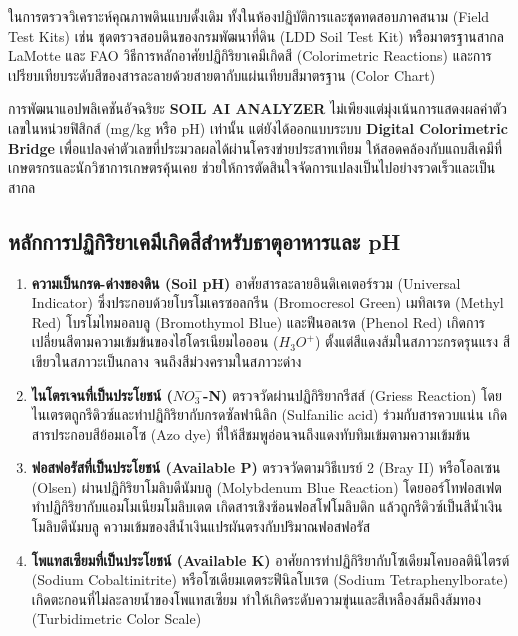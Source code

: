 ในการตรวจวิเคราะห์คุณภาพดินแบบดั้งเดิม ทั้งในห้องปฏิบัติการและชุดทดสอบภาคสนาม (Field Test Kits) เช่น ชุดตรวจสอบดินของกรมพัฒนาที่ดิน (LDD Soil Test Kit) หรือมาตรฐานสากล LaMotte และ FAO วิธีการหลักอาศัยปฏิกิริยาเคมีเกิดสี (Colorimetric Reactions) และการเปรียบเทียบระดับสีของสารละลายด้วยสายตากับแผ่นเทียบสีมาตรฐาน (Color Chart)

การพัฒนาแอปพลิเคชันอัจฉริยะ \textbf{SOIL AI ANALYZER} ไม่เพียงแต่มุ่งเน้นการแสดงผลค่าตัวเลขในหน่วยฟิสิกส์ ($\text{mg/kg}$ หรือ $\text{pH}$) เท่านั้น แต่ยังได้ออกแบบระบบ \textbf{Digital Colorimetric Bridge} เพื่อแปลงค่าตัวเลขที่ประมวลผลได้ผ่านโครงข่ายประสาทเทียม ให้สอดคล้องกับแถบสีเคมีที่เกษตรกรและนักวิชาการเกษตรคุ้นเคย ช่วยให้การตัดสินใจจัดการแปลงเป็นไปอย่างรวดเร็วและเป็นสากล

\subsection{หลักการปฏิกิริยาเคมีเกิดสีสำหรับธาตุอาหารและ pH}

\begin{enumerate}
    \item \textbf{ความเป็นกรด-ด่างของดิน (Soil pH)} อาศัยสารละลายอินดิเคเตอร์รวม (Universal Indicator) ซึ่งประกอบด้วยโบรโมเครซอลกรีน (Bromocresol Green) เมทิลเรด (Methyl Red) โบรโมไทมอลบลู (Bromothymol Blue) และฟีนอลเรด (Phenol Red) เกิดการเปลี่ยนสีตามความเข้มข้นของไฮโดรเนียมไอออน ($H_3O^+$) ตั้งแต่สีแดงส้มในสภาวะกรดรุนแรง สีเขียวในสภาวะเป็นกลาง จนถึงสีม่วงครามในสภาวะด่าง
    \item \textbf{ไนโตรเจนที่เป็นประโยชน์ ($NO_3^-$-N)} ตรวจวัดผ่านปฏิกิริยากรีสส์ (Griess Reaction) โดยไนเตรตถูกรีดิวซ์และทำปฏิกิริยากับกรดซัลฟานิลิก (Sulfanilic acid) ร่วมกับสารควบแน่น เกิดสารประกอบสีย้อมเอโซ (Azo dye) ที่ให้สีชมพูอ่อนจนถึงแดงทับทิมเข้มตามความเข้มข้น
    \item \textbf{ฟอสฟอรัสที่เป็นประโยชน์ (Available P)} ตรวจวัดตามวิธีเบรย์ 2 (Bray II) หรือโอลเซน (Olsen) ผ่านปฏิกิริยาโมลิบดีนัมบลู (Molybdenum Blue Reaction) โดยออร์โทฟอสเฟตทำปฏิกิริยากับแอมโมเนียมโมลิบเดต เกิดสารเชิงซ้อนฟอสโฟโมลิบดิก แล้วถูกรีดิวซ์เป็นสีน้ำเงินโมลิบดีนัมบลู ความเข้มของสีน้ำเงินแปรผันตรงกับปริมาณฟอสฟอรัส
    \item \textbf{โพแทสเซียมที่เป็นประโยชน์ (Available K)} อาศัยการทำปฏิกิริยากับโซเดียมโคบอลตินิไตรต์ (Sodium Cobaltinitrite) หรือโซเดียมเตตระฟีนิลโบเรต (Sodium Tetraphenylborate) เกิดตะกอนที่ไม่ละลายน้ำของโพแทสเซียม ทำให้เกิดระดับความขุ่นและสีเหลืองส้มถึงส้มทอง (Turbidimetric Color Scale)
\end{enumerate}

